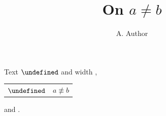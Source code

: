 \documentclass{article}
\title{On $a\neq b$}
\author{A. Author}
\date{}
\let\neq\undefined\DeclareMathSymbol{\neq}{\mathrel}{symbolsC}{44}
\let\doteq\undefined\DeclareMathSymbol{\doteq}{\mathrel}{symbolsC}{17}
\begin{document}
\maketitle
Text $\mathchoice{\neq}{\neq}{\neq}{\neq}$ and \settowidth{\dimen0}{$\doteq$}width \the{},
\begin{tabular}{cc} $\neq$ & $a\nequiv b$ \\ \end{tabular}
and \usebox{\omegabox}.
\end{document}
